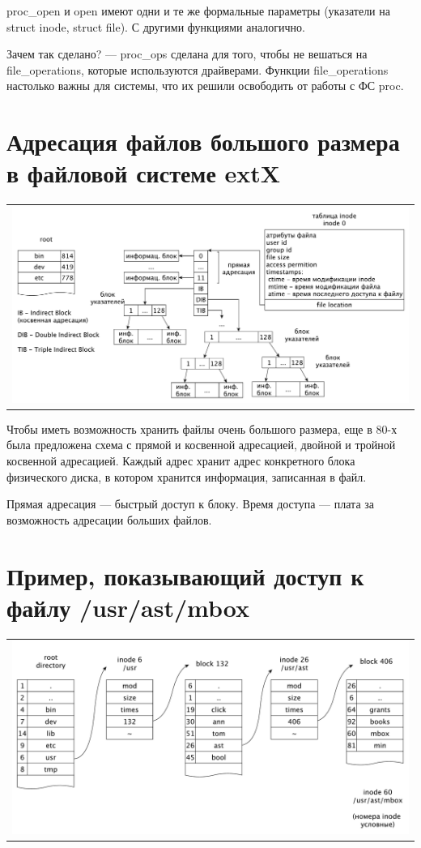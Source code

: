 proc\_open и open имеют одни и те же формальные параметры (указатели на struct inode, struct file). С другими функциями аналогично.

Зачем так сделано? --- proc\_ops сделана для того, чтобы не вешаться на file\_operations, которые используются драйверами. Функции file\_operations настолько важны для системы, что их решили освободить от работы с ФС proc.

\section{Адресация файлов большого размера в файловой системе extX}

\begin{table}[h!]
  \centering
  \begin{tabular}{p{1\linewidth}}
    \centering
    \includegraphics[width=0.8\linewidth]{./images/extX.pdf}
  \end{tabular}
\end{table}

Чтобы иметь возможность хранить файлы очень большого размера, еще в 80-х была предложена схема с прямой и косвенной адресацией, двойной и тройной косвенной адресацией. Каждый адрес хранит адрес конкретного блока физического диска, в котором хранится информация, записанная в файл.

Прямая адресация --- быстрый доступ к блоку. Время доступа --- плата за возможность адресации больших файлов.

\section{Пример, показывающий доступ к файлу /usr/ast/mbox}

\begin{table}[h!]
  \centering
  \begin{tabular}{p{1\linewidth}}
    \centering
    \includegraphics[width=0.8\linewidth]{./images/mbox.pdf}
  \end{tabular}
\end{table}

